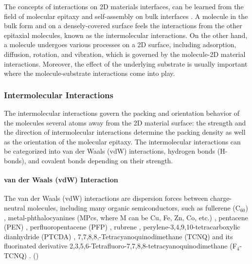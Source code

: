 The concepts of interactions on 2D materials interfaces, can be
learned from the field of molecular epitaxy and self-assembly on bulk
interfaces
\cite{Kowarik_2008_rev_MBE,Barth_2007,Whitesides_2002_assem_rev,Philips_2D_assem_book}.
% 
A molecule in the bulk
form and on a densely-covered surface feels the interactions from the
other epitaxial molecules, known as the intermolecular
interactions. On the other hand, a molecule undergoes various
processes on a 2D surface, including adsorption, diffusion, rotation,
and vibration, which is governed by the molecule-2D material
interactions. Moreover, the effect of the underlying substrate is
usually important where the molecule-substrate interactions come into
play. 

\subsubsection{Intermolecular Interactions}
\label{sec:intro-inter-mole}

The intermolecular interactions govern the packing and orientation
behavior of the molecules several atoms away from the 2D material
surface: the strength and the direction of intermolecular interactions
determine the packing density as well as the orientation of the
molecular epitaxy. The intermolecular interactions can be categorized 
into van der Waals (vdW) interactions, hydrogen bonds (H-bonds), and
covalent bonds depending on their strength. 

\paragraph{van der Waals (vdW) Interaction}

The van der Waals (vdW) interactions are dispersion forces between
charge-neutral molecules, including many organic semiconductors, such
as fullerene (C\(_{\text{60}}\))
\cite{Corso_2004_C60_hBN,Kim_2015_c60_gr,Chen_2016_c60_mos2},
metal-phthalo\-cyanines (MPcs, where M can be Cu, Fe, Zn, Co, etc.)
\cite{Xiao_2013_jacs_CuPc_gr,Wang_2010_selec_F16_gr,Zhang_2011_FePc_gr,Hamalainen_2012_CoPc_gr_Ir,Ying_Mao_2011_ge_clAlPc,Ogawa_2013_AlCiPc_gr,Pak_2015_CuPc_MoS2,Avvisati_2017_FePc_intercal,Iannuzzi_2014_MPc_hBN_Rh},
pentacene (PEN)
\cite{Lee_2011_pentacene,Jariwala_2016_Mos2_pentacene,Shen_2017_DFT_mos2_pent,Kim_2016_trap_Mos2_pent,Nguyen_2015_pent_gr_wett,Betti_2007_orien_pentacene},
perfluoropentacene (PFP)
\cite{Salzmann_2012_fpen_gr,Breuer_2016_acnene_mos2}, rubrene
\cite{Lee_2014_rubene_hBN}, perylene-3,4,9,10-tetra\-carboxylic
dianhydride (PTCDA)
\cite{Wang_2009_STM_PTCDA_Gr,Tian_2010_PTCDA_gr,Huang_2009_PTCDA_gr,Meissner_2012_PTCDA_BLG},
7,7,8,8,-Tetra\-cyanoquino\-dimethane (TCNQ) and its fluorinated
derivative 2,3,5,6-Tetra\-fluoro-7,7,8,8-tetra\-cyanoquino\-dimethane
(F\(_{\text{4}}\)-TCNQ)
\cite{Chen_2007_TCNQ_gr,Hong_2013_ftcnq_gr,Stradi_2014_TCNQ_gr_Ru,Tsai_2015_TCNQ_gr_hbn}.
()


